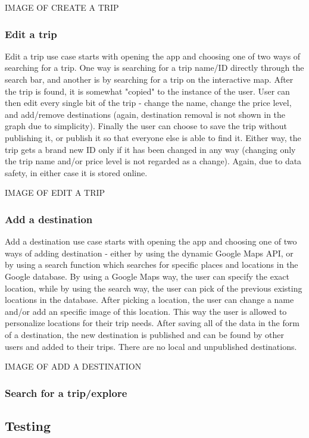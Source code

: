 IMAGE OF CREATE A TRIP

\subsubsection{Edit a trip}

Edit a trip use case starts with opening the app and choosing one of two ways of searching for a trip. One way is searching for a trip name/ID directly through the search bar, and another is by searching for a trip on the interactive map. After the trip is found, it is somewhat "copied" to the instance of the user. User can then edit every single bit of the trip - change the name, change the price level, and add/remove destinations (again, destination removal is not shown in the graph due to simplicity). Finally the user can choose to save the trip without publishing it, or publish it so that everyone else is able to find it. Either way, the trip gets a brand new ID only if it has been changed in any way (changing only the trip name and/or price level is not regarded as a change). Again, due to data safety, in either case it is stored online.

IMAGE OF EDIT A TRIP

\subsubsection{Add a destination}

Add a destination use case starts with opening the app and choosing one of two ways of adding destination - either by using the dynamic Google Maps API, or by using a search function which searches for specific places and locations in the Google database. By using a Google Maps way, the user can specify the exact location, while by using the search way, the user can pick of the previous existing locations in the database. After picking a location, the user can change a name and/or add an specific image of this location. This way the user is allowed to personalize locations for their trip needs. After saving all of the data in the form of a destination, the new destination is published and can be found by other users and added to their trips. There are no local and unpublished destinations.

IMAGE OF ADD A DESTINATION

\subsubsection{Search for a trip/explore}

\subsection{Testing}
